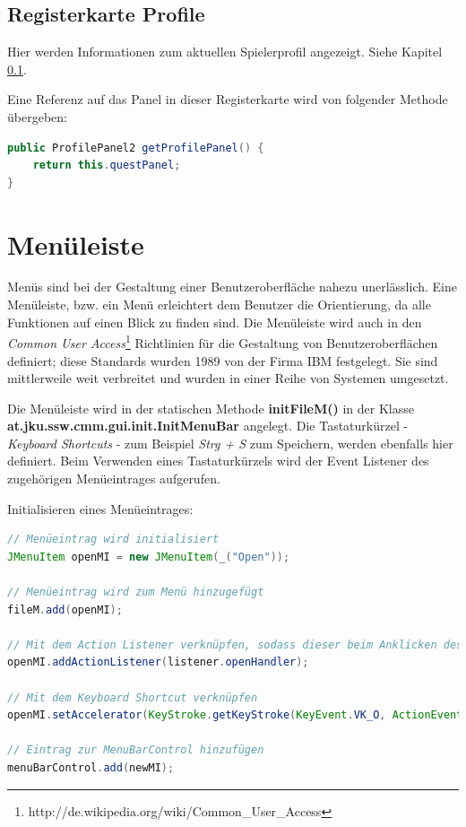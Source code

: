 \subsection{Registerkarte \glqq{}Profile\grqq{}}
Hier werden Informationen zum aktuellen Spielerprofil angezeigt. Siehe Kapitel \ref{}.

Eine Referenz auf das Panel in dieser Registerkarte wird von folgender Methode übergeben:
\begin{lstlisting}[language=JAVA]
public ProfilePanel2 getProfilePanel() {
	return this.questPanel;
}
\end{lstlisting}

\section{Menüleiste}
\label{sec:gui-main-menu}
Menüs sind bei der Gestaltung einer Benutzeroberfläche nahezu unerlässlich. Eine Menüleiste, bzw. ein Menü erleichtert dem Benutzer die Orientierung, da alle Funktionen auf einen Blick zu finden sind. Die Menüleiste wird auch in den \emph{Common User Access}\footnote{http://de.wikipedia.org/wiki/Common\_User\_Access} Richtlinien für die Gestaltung von Benutzeroberflächen definiert; diese Standards wurden 1989 von der Firma IBM festgelegt. Sie sind mittlerweile weit verbreitet und wurden in einer Reihe von Systemen umgesetzt.

Die Menüleiste wird in der statischen Methode \textbf{initFileM()} in der Klasse \textbf{at.jku.ssw.cmm.gui.init.InitMenuBar} angelegt. Die Tastaturkürzel - \emph{\glqq{}Keyboard Shortcuts\grqq{}} - zum Beispiel \emph{Strg + S} zum Speichern, werden ebenfalls hier definiert. Beim Verwenden eines Tastaturkürzels wird der Event Listener des zugehörigen Menüeintrages aufgerufen.

Initialisieren eines Menüeintrages:
\begin{lstlisting}[language=JAVA]
// Menüeintrag wird initialisiert
JMenuItem openMI = new JMenuItem(_("Open"));

// Menüeintrag wird zum Menü hinzugefügt
fileM.add(openMI);

// Mit dem Action Listener verknüpfen, sodass dieser beim Anklicken des Menüs aufgerufen wird
openMI.addActionListener(listener.openHandler);

// Mit dem Keyboard Shortcut verknüpfen
openMI.setAccelerator(KeyStroke.getKeyStroke(KeyEvent.VK_O, ActionEvent.CTRL_MASK));

// Eintrag zur MenuBarControl hinzufügen
menuBarControl.add(newMI);
\end{lstlisting}


